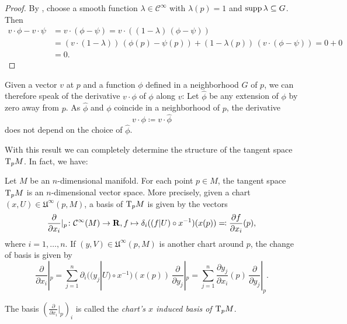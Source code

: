 \begin{proof}
  By , choose a smooth function $\lambda \in
  \mathcal C^\infty$ with $\lambda(p) = 1$ and $\operatorname{supp} \lambda \subseteq G$. Then
  \[
    \begin{split}
      v \cdot \phi - v \cdot \psi
      & = v \cdot (\phi - \psi) = v \cdot \left((1 - \lambda) \, (\phi - \psi)\right) \\
      & = \left(v \cdot (1 - \lambda)\right) \, (\phi(p) - \psi(p))
      + (1 - \lambda(p)) \, \left(v \cdot (\phi - \psi)\right) = 0 + 0 \\
      & = 0.
    \end{split}
  \]
\end{proof}

Given a vector $v$ at $p$ and a function $\phi$ defined in a neighborhood $G$
of $p$, we can therefore speak of the derivative $v \cdot \phi$ of $\phi$ along
$v$: Let $\widehat\phi$ be any extension of $\phi$ by zero away from $p$. As
$\widehat\phi$ and $\phi$ coincide in a neighborhood of $p$, the derivative
\[
  v \cdot \phi \coloneqq v \cdot \widehat\phi
\]
does not depend on the choice of $\widehat\phi$.

With this result we can completely determine the structure of the tangent space
$\mathrm T_p M$. In fact, we have:

\begin{thm}
  \label{thm:coordinate_basis}
  Let $M$ be an $n$-dimensional manifold. For each point $p \in M$, the tangent
  space $\mathrm T_p M$ is an $n$-dimensional vector space. More precisely, given
  a chart $(x, U) \in \mathfrak U^\infty(p, M)$, a basis of $\mathrm T_p M$ is given
  by the vectors
  \begin{equation}
    \label{eq:coordinate_basis}
    \frac{\partial}{\partial x_i}|_p\colon \mathcal C^\infty(M)
    \to \mathbf{R}, f \mapsto \delta_i ((f|U) \circ x^{-1}) (x(p))
    \eqqcolon \frac{\partial f}{\partial x_i}(p),  
  \end{equation}
  where $i = 1, \dotsc, n$. If $(y, V) \in \mathfrak U^\infty(p, M)$ is another
  chart around $p$, the change of basis is given by
  \begin{equation}
    \label{eq:basis_change}
    \frac{\partial}{\partial x_i}|_p =
    \sum_{j = 1}^n \partial_i ((y_j|U) \circ x^{-1}) (x(p))
    \, \frac{\partial}{\partial y_j}|_p
    =
    \sum_{j = 1}^n \frac{\partial y_j}{\partial x_i}(p) \, 
    \frac{\partial}{\partial y_j}|_p.
  \end{equation}
\end{thm}
The basis $(\frac{\partial}{\partial x_i}|_p)_i$ is called the
\emph{chart's $x$ induced basis of $\mathrm T_p M$}.

